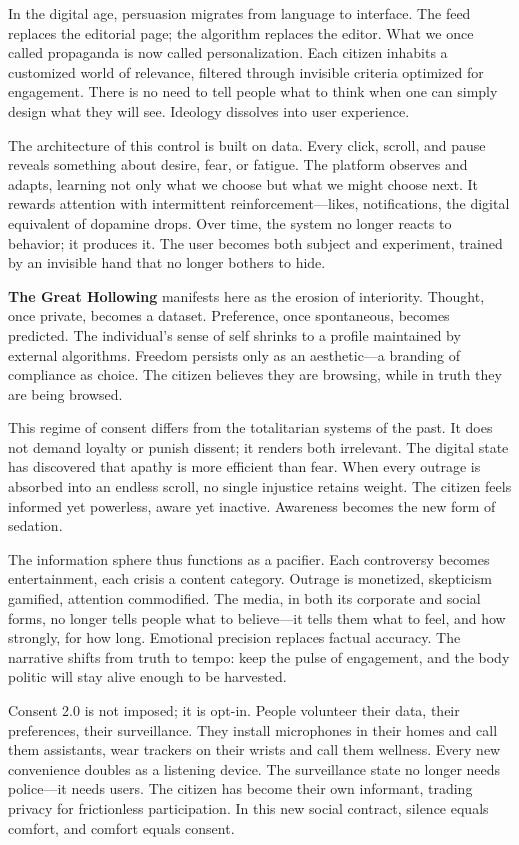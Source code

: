 \documentclass[11pt,twoside]{book}
\begin{document}
In the digital age, persuasion migrates from language to interface.  The feed replaces the editorial page; the algorithm replaces the editor.  What we once called propaganda is now called personalization.  Each citizen inhabits a customized world of relevance, filtered through invisible criteria optimized for engagement.  There is no need to tell people what to think when one can simply design what they will see.  Ideology dissolves into user experience.

The architecture of this control is built on data.  Every click, scroll, and pause reveals something about desire, fear, or fatigue.  The platform observes and adapts, learning not only what we choose but what we might choose next.  It rewards attention with intermittent reinforcement—likes, notifications, the digital equivalent of dopamine drops.  Over time, the system no longer reacts to behavior; it produces it.  The user becomes both subject and experiment, trained by an invisible hand that no longer bothers to hide.

\textbf{The Great Hollowing} manifests here as the erosion of interiority.  Thought, once private, becomes a dataset.  Preference, once spontaneous, becomes predicted.  The individual’s sense of self shrinks to a profile maintained by external algorithms.  Freedom persists only as an aesthetic—a branding of compliance as choice.  The citizen believes they are browsing, while in truth they are being browsed.

This regime of consent differs from the totalitarian systems of the past.  It does not demand loyalty or punish dissent; it renders both irrelevant.  The digital state has discovered that apathy is more efficient than fear.  When every outrage is absorbed into an endless scroll, no single injustice retains weight.  The citizen feels informed yet powerless, aware yet inactive.  Awareness becomes the new form of sedation.

The information sphere thus functions as a pacifier.  Each controversy becomes entertainment, each crisis a content category.  Outrage is monetized, skepticism gamified, attention commodified.  The media, in both its corporate and social forms, no longer tells people what to believe—it tells them what to feel, and how strongly, for how long.  Emotional precision replaces factual accuracy.  The narrative shifts from truth to tempo: keep the pulse of engagement, and the body politic will stay alive enough to be harvested.

Consent 2.0 is not imposed; it is opt-in.  People volunteer their data, their preferences, their surveillance.  They install microphones in their homes and call them assistants, wear trackers on their wrists and call them wellness.  Every new convenience doubles as a listening device.  The surveillance state no longer needs police—it needs users.  The citizen has become their own informant, trading privacy for frictionless participation.  In this new social contract, silence equals comfort, and comfort equals consent.
\end{document}
